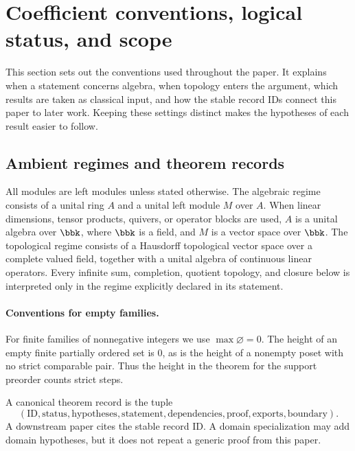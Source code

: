 \section{Coefficient conventions, logical status, and scope}
\begin{readerroadmap}
This section sets out the conventions used throughout the paper.  It explains when a statement concerns algebra, when topology enters the argument, which results are taken as classical input, and how the stable record IDs connect this paper to later work.  Keeping these settings distinct makes the hypotheses of each result easier to follow.
\end{readerroadmap}
\subsection{Ambient regimes and theorem records}

\begin{definition}
\label{def:coefficient-regime}
All modules are left modules unless stated otherwise.  The algebraic regime consists of a unital ring $A$ and a unital left module $M$ over $A$.  When linear dimensions, tensor products, quivers, or operator blocks are used, $A$ is a unital algebra over $\bbk$, where $\bbk$ is a field, and $M$ is a vector space over $\bbk$.  The topological regime consists of a Hausdorff topological vector space over a complete valued field, together with a unital algebra of continuous linear operators.  Every infinite sum, completion, quotient topology, and closure below is interpreted only in the regime explicitly declared in its statement.
\end{definition}
\paragraph{Conventions for empty families.} For finite families of nonnegative integers we use $\max\varnothing=0$. The height of an empty finite partially ordered set is $0$, as is the height of a nonempty poset with no strict comparable pair. Thus the height in the theorem for the support preorder counts strict steps.

\begin{definition}
\label{def:theorem-record}
A canonical theorem record is the tuple
\[
(\mathrm{ID},\mathrm{status},\mathrm{hypotheses},\mathrm{statement},
\mathrm{dependencies},\mathrm{proof},\mathrm{exports},\mathrm{boundary}).
\]
A downstream paper cites the stable record ID.  A domain specialization may add domain hypotheses, but it does not repeat a generic proof from this paper.
\end{definition}

